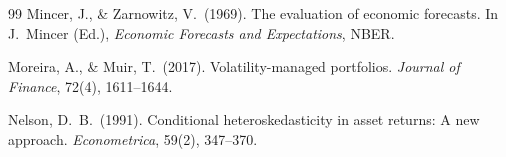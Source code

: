 \documentclass[12pt, a4paper]{article}
\begin{document}
\begin{thebibliography}{99}
Mincer, J., \& Zarnowitz, V.\ (1969). The evaluation of economic forecasts. In J.\ Mincer
(Ed.), \textit{Economic Forecasts and Expectations}, NBER.

Moreira, A., \& Muir, T.\ (2017). Volatility-managed portfolios.
\textit{Journal of Finance}, 72(4), 1611--1644.

Nelson, D.\ B.\ (1991). Conditional heteroskedasticity in asset returns: A new approach.
\textit{Econometrica}, 59(2), 347--370.
\end{thebibliography}
\end{document}
